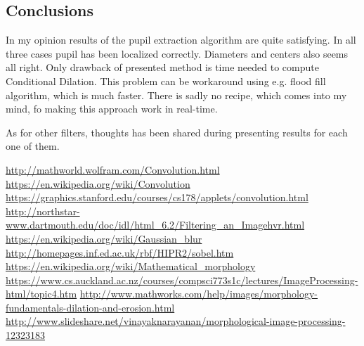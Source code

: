 \documentclass{article}
\begin{document}
\newpage
\subsection{Conclusions}
In my opinion results of the pupil extraction algorithm are quite satisfying. In all three cases pupil has been localized correctly. Diameters and centers also seems all right. Only drawback of presented method is time needed to compute Conditional Dilation. This problem can be workaround using e.g. flood fill algorithm, which is much faster. There is sadly no recipe, which comes into my mind, fo making this approach work in real-time.

As for other filters, thoughts has been shared during presenting results for each one of them.


\begin{thebibliography}{1}
	 \url{http://mathworld.wolfram.com/Convolution.html}
	 \url{https://en.wikipedia.org/wiki/Convolution}
	 \url{https://graphics.stanford.edu/courses/cs178/applets/convolution.html}
	 \url{http://northstar-www.dartmouth.edu/doc/idl/html_6.2/Filtering_an_Imagehvr.html}
	 \url{https://en.wikipedia.org/wiki/Gaussian_blur}
	 \url{http://homepages.inf.ed.ac.uk/rbf/HIPR2/sobel.htm}
	 \url{https://en.wikipedia.org/wiki/Mathematical_morphology}	
	 \url{https://www.cs.auckland.ac.nz/courses/compsci773s1c/lectures/ImageProcessing-html/topic4.htm}		
	 \url{http://www.mathworks.com/help/images/morphology-fundamentals-dilation-and-erosion.html}
	 \url{http://www.slideshare.net/vinayaknarayanan/morphological-image-processing-12323183}
	
\end{thebibliography}

\end{document}
